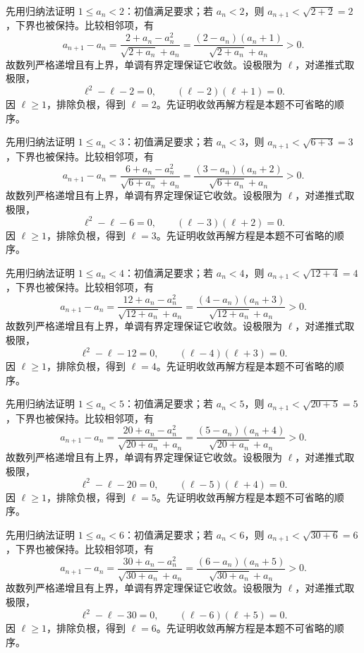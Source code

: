 \documentclass[UTF8,12pt,a4paper,fontset=fandol]{ctexart}
\begin{document}
\begin{solve}\label{ans:c1q19}
先用归纳法证明 $1\le a_n<2$：初值满足要求；若 $a_n<2$，则 $a_{n+1}<\sqrt{2+2}=2$，下界也被保持。比较相邻项，有
\[
a_{n+1}-a_n=\frac{2+a_n-a_n^2}{\sqrt{2+a_n}+a_n}=\frac{(2-a_n)(a_n+1)}{\sqrt{2+a_n}+a_n}>0.
\]
故数列严格递增且有上界，单调有界定理保证它收敛。设极限为 $\ell$，对递推式取极限，
\[
\ell^2-\ell-2=0,\qquad(\ell-2)(\ell+1)=0.
\]
因 $\ell\ge1$，排除负根，得到 $\ell=2$。先证明收敛再解方程是本题不可省略的顺序。
\end{solve}

\begin{solve}\label{ans:c1q20}
先用归纳法证明 $1\le a_n<3$：初值满足要求；若 $a_n<3$，则 $a_{n+1}<\sqrt{6+3}=3$，下界也被保持。比较相邻项，有
\[
a_{n+1}-a_n=\frac{6+a_n-a_n^2}{\sqrt{6+a_n}+a_n}=\frac{(3-a_n)(a_n+2)}{\sqrt{6+a_n}+a_n}>0.
\]
故数列严格递增且有上界，单调有界定理保证它收敛。设极限为 $\ell$，对递推式取极限，
\[
\ell^2-\ell-6=0,\qquad(\ell-3)(\ell+2)=0.
\]
因 $\ell\ge1$，排除负根，得到 $\ell=3$。先证明收敛再解方程是本题不可省略的顺序。
\end{solve}

\begin{solve}\label{ans:c1q21}
先用归纳法证明 $1\le a_n<4$：初值满足要求；若 $a_n<4$，则 $a_{n+1}<\sqrt{12+4}=4$，下界也被保持。比较相邻项，有
\[
a_{n+1}-a_n=\frac{12+a_n-a_n^2}{\sqrt{12+a_n}+a_n}=\frac{(4-a_n)(a_n+3)}{\sqrt{12+a_n}+a_n}>0.
\]
故数列严格递增且有上界，单调有界定理保证它收敛。设极限为 $\ell$，对递推式取极限，
\[
\ell^2-\ell-12=0,\qquad(\ell-4)(\ell+3)=0.
\]
因 $\ell\ge1$，排除负根，得到 $\ell=4$。先证明收敛再解方程是本题不可省略的顺序。
\end{solve}

\begin{solve}\label{ans:c1q22}
先用归纳法证明 $1\le a_n<5$：初值满足要求；若 $a_n<5$，则 $a_{n+1}<\sqrt{20+5}=5$，下界也被保持。比较相邻项，有
\[
a_{n+1}-a_n=\frac{20+a_n-a_n^2}{\sqrt{20+a_n}+a_n}=\frac{(5-a_n)(a_n+4)}{\sqrt{20+a_n}+a_n}>0.
\]
故数列严格递增且有上界，单调有界定理保证它收敛。设极限为 $\ell$，对递推式取极限，
\[
\ell^2-\ell-20=0,\qquad(\ell-5)(\ell+4)=0.
\]
因 $\ell\ge1$，排除负根，得到 $\ell=5$。先证明收敛再解方程是本题不可省略的顺序。
\end{solve}

\begin{solve}\label{ans:c1q23}
先用归纳法证明 $1\le a_n<6$：初值满足要求；若 $a_n<6$，则 $a_{n+1}<\sqrt{30+6}=6$，下界也被保持。比较相邻项，有
\[
a_{n+1}-a_n=\frac{30+a_n-a_n^2}{\sqrt{30+a_n}+a_n}=\frac{(6-a_n)(a_n+5)}{\sqrt{30+a_n}+a_n}>0.
\]
故数列严格递增且有上界，单调有界定理保证它收敛。设极限为 $\ell$，对递推式取极限，
\[
\ell^2-\ell-30=0,\qquad(\ell-6)(\ell+5)=0.
\]
因 $\ell\ge1$，排除负根，得到 $\ell=6$。先证明收敛再解方程是本题不可省略的顺序。
\end{solve}
\end{document}
